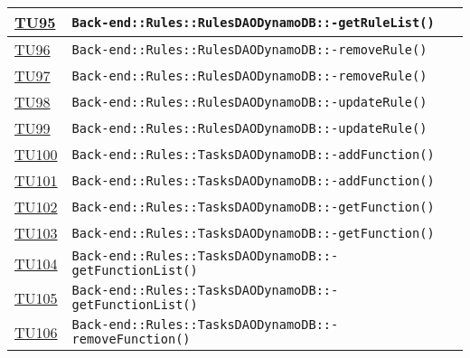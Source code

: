 \begin{longtable}{|>{\centering}m{1cm}|m{12cm}<{\centering}|}
\hyperlink{TU95}{TU95} & \texttt{Back-end::Rules::RulesDAODynamoDB::-\linebreak getRuleList()}\\ \hline

\hyperlink{TU96}{TU96} & \texttt{Back-end::Rules::RulesDAODynamoDB::-\linebreak removeRule()}\\ \hline

\hyperlink{TU97}{TU97} & \texttt{Back-end::Rules::RulesDAODynamoDB::-\linebreak removeRule()}\\ \hline

\hyperlink{TU98}{TU98} & \texttt{Back-end::Rules::RulesDAODynamoDB::-\linebreak updateRule()}\\ \hline

\hyperlink{TU99}{TU99} & \texttt{Back-end::Rules::RulesDAODynamoDB::-\linebreak updateRule()}\\ \hline

\hyperlink{TU100}{TU100} & \texttt{Back-end::Rules::TasksDAODynamoDB::-\linebreak addFunction()}\\ \hline

\hyperlink{TU101}{TU101} & \texttt{Back-end::Rules::TasksDAODynamoDB::-\linebreak addFunction()}\\ \hline

\hyperlink{TU102}{TU102} & \texttt{Back-end::Rules::TasksDAODynamoDB::-\linebreak getFunction()}\\ \hline

\hyperlink{TU103}{TU103} & \texttt{Back-end::Rules::TasksDAODynamoDB::-\linebreak getFunction()}\\ \hline

\hyperlink{TU104}{TU104} & \texttt{Back-end::Rules::TasksDAODynamoDB::-\linebreak getFunctionList()}\\ \hline

\hyperlink{TU105}{TU105} & \texttt{Back-end::Rules::TasksDAODynamoDB::-\linebreak getFunctionList()}\\ \hline

\hyperlink{TU106}{TU106} & \texttt{Back-end::Rules::TasksDAODynamoDB::-\linebreak removeFunction()}\\ \hline


\end{longtable}
